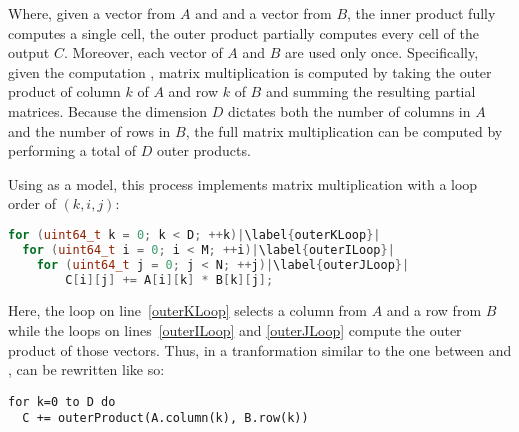 \documentclass[\main/thesis.tex]{subfiles}
\begin{document}
Where, given a vector from $A$ and and a vector from $B$, the inner product fully computes a single cell, the outer product partially computes every cell of the output $C$.
Moreover, each vector of $A$ and $B$ are used only once.
Specifically, given the computation , matrix multiplication is computed by taking the outer product of column $k$ of $A$ and row $k$ of $B$ and summing the resulting partial matrices.
Because the dimension $D$ dictates both the number of columns in $A$ and the number of rows in $B$, the full matrix multiplication can be computed by performing a total of $D$ outer products.

Using  as a model, this process implements matrix multiplication with a loop order of $(k, i, j)$:
\begin{lstlisting}[caption={[Basic matrix multiplication via outer product]A basic matrix multiplication via outer product.},label=lst:basicOuter,language=C++,columns=flexible,morekeywords=uint64_t,escapechar=|]
for (uint64_t k = 0; k < D; ++k)|\label{outerKLoop}|
  for (uint64_t i = 0; i < M; ++i)|\label{outerILoop}|
    for (uint64_t j = 0; j < N; ++j)|\label{outerJLoop}|
        C[i][j] += A[i][k] * B[k][j];
\end{lstlisting}
Here, the loop on line~\ref{outerKLoop} selects a column from $A$ and a row from $B$ while the loops on lines~\ref{outerILoop} and \ref{outerJLoop} compute the outer product of those vectors.
Thus, in a tranformation similar to the one between  and ,  can be rewritten like so:
\begin{lstlisting}[caption={[Matrix multiplication pseudocode using outer product]A basic matrix multiplication via outer product broken into logical concepts.},label=lst:basicOuterPseudo,columns=flexible]
for k=0 to D do
  C += outerProduct(A.column(k), B.row(k))
\end{lstlisting}
\end{document}

